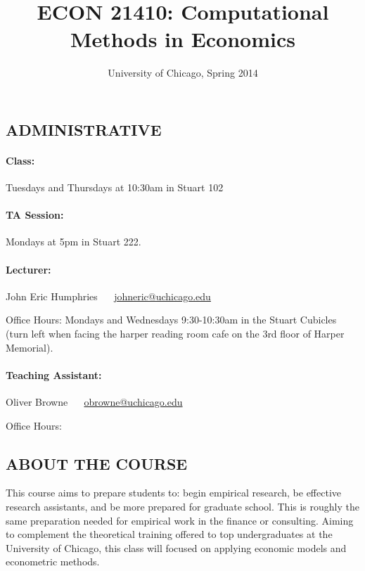 \documentclass{scrartcl}
\title{ECON 21410: Computational Methods in Economics}
\subtitle{University of Chicago, Spring 2014}
\date{}
\begin{document}
\maketitle


\subsection*{ADMINISTRATIVE}

\paragraph{Class:} Tuesdays and Thursdays at 10:30am in Stuart 102

\paragraph{TA Session:} Mondays at 5pm in Stuart 222.

\paragraph{Lecturer:}  
John Eric Humphries ~~ \href{mailto:johneric@uchicago.edu}{johneric@uchicago.edu}

Office Hours: Mondays and Wednesdays 9:30-10:30am in the Stuart Cubicles (turn left when facing the harper reading room cafe on the 3rd floor of Harper Memorial). 

\paragraph{Teaching Assistant:}
Oliver Browne ~~  \href{mailto:obrowne@uchicago.edu}{obrowne@uchicago.edu}

Office Hours:

\subsection*{ABOUT THE COURSE}

This course aims to prepare students to: begin empirical research, be effective research assistants, and be more prepared for graduate school. This is roughly the same preparation needed for empirical work in the finance or consulting. Aiming to complement the theoretical training offered to top undergraduates at the University of Chicago, this class will focused on applying economic models and econometric methods. 
\end{document}
